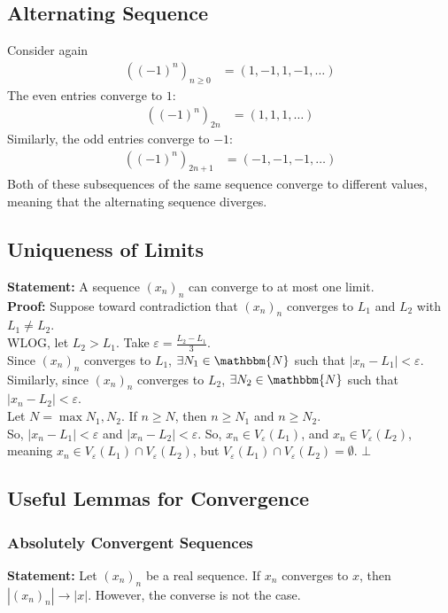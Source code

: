 \documentclass[10pt]{extarticle}
\newcommand{\N}{\mathbbm{N}}
\begin{document}
  \subsection{Alternating Sequence}%
    Consider again
    \begin{align*}
      \left((-1)^n\right)_{n\geq 0} &= (1,-1,1,-1,\dots)
    \end{align*}
    The even entries converge to $1$:
    \begin{align*}
      \left((-1)^n\right)_{2n} &= (1,1,1,\dots)
    \end{align*}
    Similarly, the odd entries converge to $-1$:
    \begin{align*}
      \left((-1)^n\right)_{2n+1} &= (-1,-1,-1,\dots)
    \end{align*}
    Both of these subsequences of the same sequence converge to different values, meaning that the alternating sequence diverges.
  \subsection{Uniqueness of Limits}%
  \textbf{Statement:} A sequence $\left(x_n\right)_n$ can converge to at most one limit.\\

  \textbf{Proof:} Suppose toward contradiction that $\left(x_n\right)_n$ converges to $L_1$ and $L_2$ with $L_1 \neq L_2$.\\

    WLOG, let $L_2 > L_1$. Take $\varepsilon = \frac{L_2 - L_1}{3}$. \\

    Since $(x_n)_n$ converges to $L_1$, $\exists N_1\in \N$ such that $|x_n - L_1| < \varepsilon$. Similarly, since $(x_n)_n$ converges to $L_2$, $\exists N_2\in \N$ such that $|x_n - L_2| < \varepsilon$.\\

    Let $N = \max{N_1,N_2}$. If $n \geq N$, then $n\geq N_1$ and $n\geq N_2$.\\

    So, $|x_n - L_1| < \varepsilon$ and $|x_n - L_2| < \varepsilon$. So, $x_n\in V_{\varepsilon}(L_1)$, and $x_n\in V_{\varepsilon}(L_2)$, meaning $x_n\in V_{\varepsilon}(L_1)\cap V_{\varepsilon}(L_2)$, but $V_{\varepsilon}(L_1)\cap V_{\varepsilon}(L_2) = \emptyset$. $\bot$
  \subsection{Useful Lemmas for Convergence}%
  \subsubsection{Absolutely Convergent Sequences}%
  \textbf{Statement:} Let $(x_n)_n$ be a real sequence. If $x_n$ converges to $x$, then $|(x_n)_n|\rightarrow |x|$. However, the converse is not the case.\\
\end{document}
